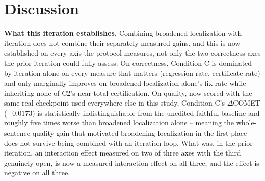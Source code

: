 \documentclass[11pt,letterpaper]{article}
\begin{document}
\section{Discussion}

\textbf{What this iteration establishes.} Combining broadened localization with iteration does not combine their separately measured gains, and this is now established on every axis the protocol measures, not only the two correctness axes the prior iteration could fully assess. On correctness, Condition C is dominated by iteration alone on every measure that matters (regression rate, certificate rate) and only marginally improves on broadened localization alone's fix rate while inheriting none of C2's near-total certification. On quality, now scored with the same real checkpoint used everywhere else in this study, Condition C's $\Delta$COMET ($-0.0173$) is statistically indistinguishable from the unedited faithful baseline and roughly five times worse than broadened localization alone -- meaning the whole-sentence quality gain that motivated broadening localization in the first place does not survive being combined with an iteration loop. What was, in the prior iteration, an interaction effect measured on two of three axes with the third genuinely open, is now a measured interaction effect on all three, and the effect is negative on all three.
\end{document}
